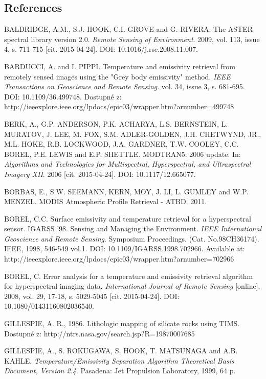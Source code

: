 \begin{thebibliography}{10}
\section*{References}


 BALDRIDGE, A.M., S.J. HOOK, C.I. GROVE and G. RIVERA. The ASTER spectral library version 2.0. \textit{Remote Sensing of Environment}. 2009, vol. 113, issue 4, s. 711-715 [cit. 2015-04-24]. DOI: 10.1016/j.rse.2008.11.007.

 BARDUCCI, A. and I. PIPPI. Temperature and emissivity retrieval from remotely sensed images using the "Grey body emissivity" method. \textit{IEEE Transactions on Geoscience and Remote Sensing}. vol. 34, issue 3, s. 681-695. DOI: 10.1109/36.499748. Dostupné z: http://ieeexplore.ieee.org/lpdocs/epic03/wrapper.htm?arnumber=499748

 BERK, A., G.P. ANDERSON, P.K. ACHARYA, L.S. BERNSTEIN, L. MURATOV, J. LEE, M. FOX, S.M. ADLER-GOLDEN, J.H. CHETWYND, JR., M.L. HOKE, R.B. LOCKWOOD, J.A. GARDNER, T.W. COOLEY, C.C. BOREL, P.E. LEWIS and E.P. SHETTLE. MODTRAN5: 2006 update. In: \textit{Algorithms and Technologies for Multispectral, Hyperspectral, and Ultraspectral Imagery XII}. 2006 [cit. 2015-04-24]. DOI: 10.1117/12.665077.

 BORBAS, E., S.W. SEEMANN, KERN, MOY, J. LI, L. GUMLEY and W.P. MENZEL. MODIS Atmospheric Profile Retrieval - ATBD. 2011. 

 BOREL, C.C. Surface emissivity and temperature retrieval for a hyperspectral sensor. IGARSS '98. Sensing and Managing the Environment. \textit{IEEE International Geoscience and Remote Sensing}. Symposium Proceedings. (Cat. No.98CH36174). IEEE, 1998, 546-549 vol.1. DOI: 10.1109/IGARSS.1998.702966. Available at: http://ieeexplore.ieee.org/lpdocs/epic03/wrapper.htm?arnumber=702966

 BOREL, C. Error analysis for a temperature and emissivity retrieval algorithm for hyperspectral imaging data. \textit{International Journal of Remote Sensing} [online]. 2008, vol. 29, 17-18, s. 5029-5045 [cit. 2015-04-24]. DOI: 10.1080/01431160802036540.

 GILLESPIE, A. R., 1986. Lithologic mapping of silicate rocks using TIMS. Dostupné z: http://ntrs.nasa.gov/search.jsp?R=19870007685

 GILLESPIE, A., S. ROKUGAWA, S. HOOK, T. MATSUNAGA and A.B. KAHLE. \textit{Temperature/Emissivity Separation Algorithm Theoretical Basis Document, Version 2.4}. Pasadena: Jet Propulsion Laboratory, 1999, 64 p.


\end{thebibliography}
